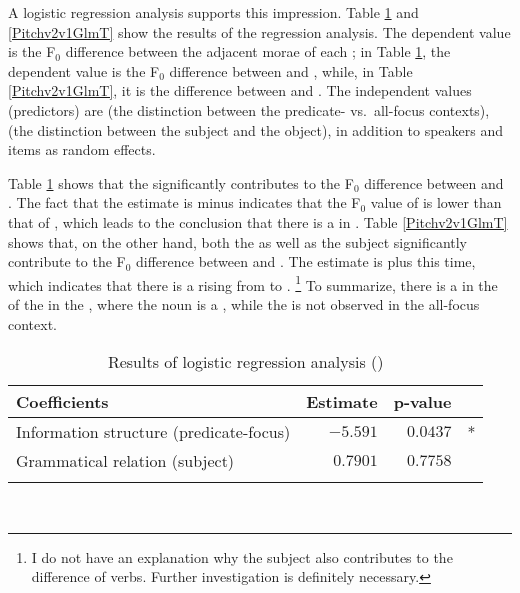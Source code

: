 A logistic regression analysis supports this impression.
Table \ref{Pitchv1n3GlmT} and \ref{Pitchv2v1GlmT} show the results of the regression analysis.
The dependent value is the F$_{0}$ difference between the adjacent morae of each ;
in Table \ref{Pitchv1n3GlmT}, the dependent value is the F$_{0}$ difference between  and ,
while, in Table \ref{Pitchv2v1GlmT},
it is the difference between  and .
The independent values (predictors) are  (the distinction between the predicate- vs.~all-focus contexts),
 (the distinction between the subject and the object),
in addition to speakers and items as random effects.

Table \ref{Pitchv1n3GlmT} shows that
the  significantly contributes to
the F$_{0}$ difference between  and .
The fact that the estimate is minus indicates that the F$_{0}$ value of  is lower than that of ,
which leads to the conclusion that there is a  in .
Table \ref{Pitchv2v1GlmT} shows that, on the other hand,
both the  as well as the subject significantly contribute to the F$_{0}$ difference between  and .
The estimate is plus this time,
which indicates that there is a  rising from  to .%
	\footnote{I do not have an explanation why the subject also contributes to the  difference of verbs.
	Further investigation is definitely necessary.}
To summarize,
there is a  in the  of the  in the , where the noun is a ,
while the  is not observed in the all-focus context.


\begin{table}
\centering
\caption{Results of logistic regression analysis ()}
\begin{tabular}{lrrr}
\lsptoprule
Coefficients  & Estimate & p-value & \\
\midrule
 Information structure (predicate-focus)          & $-5.591$   & $0.0437$  & *  \\
 Grammatical relation (subject)          & $0.7901$   & $0.7758$  &   \\
\lspbottomrule
\end{tabular} \\
\label{Pitchv1n3GlmT}
\end{table}

